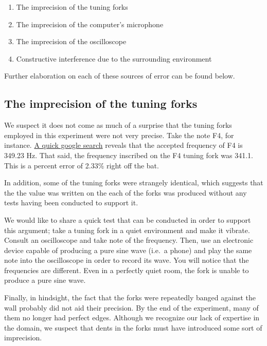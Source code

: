 \documentclass[12pt,oneside]{article}
\begin{document}
\begin{enumerate}
\def\labelenumi{\arabic{enumi}.}
\tightlist
\item
  The imprecision of the tuning forks
\item
  The imprecision of the computer's microphone
\item
  The imprecision of the oscilloscope
\item
  Constructive interference due to the surrounding environment
\end{enumerate}

Further elaboration on each of these sources of error can be found
below.

\hypertarget{the-imprecision-of-the-tuning-forks}{%
\subsection*{The imprecision of the tuning
forks}\label{the-imprecision-of-the-tuning-forks}}

We suspect it does not come as much of a surprise that the tuning forks
employed in this experiment were not very precise. Take the note F4, for
instance. \href{https://pages.mtu.edu/~suits/notefreqs.html}{A quick
google search} reveals that the accepted frequency of F4 is 349.23 Hz.
That said, the frequency inscribed on the F4 tuning fork was 341.1. This
is a percent error of 2.33\% right off the bat.

\par

In addition, some of the tuning forks were strangely identical, which
suggests that the the value was written on the each of the forks was
produced without any tests having been conducted to support it.

\par

We would like to share a quick test that can be conducted in order to
support this argument; take a tuning fork in a quiet environment and
make it vibrate. Consult an oscilloscope and take note of the frequency.
Then, use an electronic device capable of producing a pure sine wave
(i.e.~a phone) and play the same note into the oscilloscope in order to
record its wave. You will notice that the frequencies are different.
Even in a perfectly quiet room, the fork is unable to produce a pure
sine wave.

\par

Finally, in hindsight, the fact that the forks were repeatedly banged
against the wall probably did not aid their precision. By the end of the
experiment, many of them no longer had perfect edges. Although we
recognize our lack of expertise in the domain, we suspect that dents in
the forks must have introduced some sort of imprecision.
\end{document}
